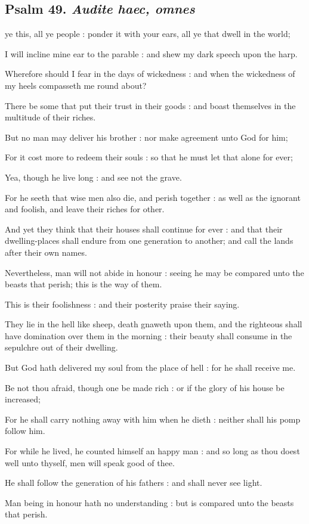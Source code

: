 \clearpage
\subsection{Psalm 49. \textit{Audite haec, omnes}}

 ye this, all ye people : ponder it with your ears, all ye that dwell in the world;\par
{}
I will incline mine ear to the parable : and shew my dark speech upon the harp.\par
{}Wherefore should I fear in the days of wickedness : and when the wickedness of my heels compasseth me round about?\par
{}There be some that put their trust in their goods : and boast themselves in the multitude of their riches.\par
{}But no man may deliver his brother : nor make agreement unto God for him;\par
{}For it cost more to redeem their souls : so that he must let that alone for ever;\par
{}Yea, though he live long : and see not the grave.\par
{}For he seeth that wise men also die, and perish together : as well as the ignorant and foolish, and leave their riches for other.\par
{}And yet they think that their houses shall continue for ever : and that their dwelling-places shall endure from one generation to another; and call the lands after their own names.\par
{}Nevertheless, man will not abide in honour : seeing he may be compared unto the beasts that perish; this is the way of them.\par
{}This is their foolishness : and their posterity praise their saying.\par
{}They lie in the hell like sheep, death gnaweth upon them, and the righteous shall have domination over them in the morning : their beauty shall consume in the sepulchre out of their dwelling.\par
{}But God hath delivered my soul from the place of hell : for he shall receive me.\par
{}Be not thou afraid, though one be made rich : or if the glory of his house be increased;\par
{}For he shall carry nothing away with him when he dieth : neither shall his pomp follow him.\par
{}For while he lived, he counted himself an happy man : and so long as thou doest well unto thyself, men will speak good of thee.\par
{}He shall follow the generation of his fathers : and shall never see light.\par
{}Man being in honour hath no understanding : but is compared unto the beasts that perish.\par

